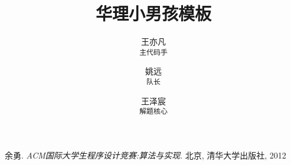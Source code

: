 \documentclass{report}
\begin{document}
\title{华理小男孩模板}
\author{
王亦凡 \\ 
\texttt{主代码手}
\and
姚远 \\ 
\texttt{队长}
\and
王泽宸 \\ 
\texttt{解题核心}
}
\maketitle
\tableofcontents
\newpage









\begin{thebibliography}{9}
余勇. 
\textit{ACM国际大学生程序设计竞赛:算法与实现}. 
北京, 清华大学出版社, 2012
\end{thebibliography}
\end{document}
